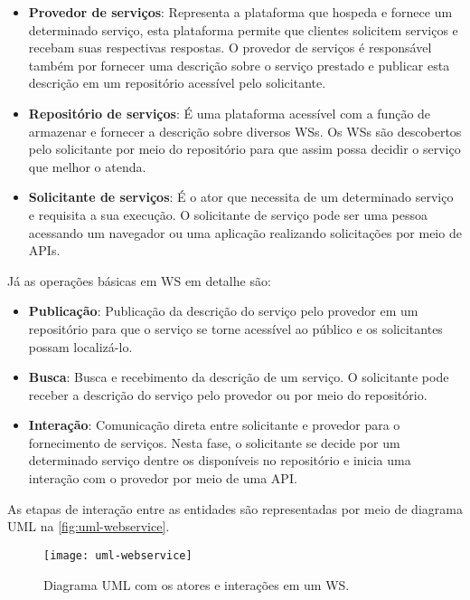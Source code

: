 	\begin{itemize}
		\item \textbf{Provedor de serviços}: Representa a plataforma que hospeda e fornece um determinado serviço, esta plataforma permite que clientes solicitem serviços e recebam suas respectivas respostas. O provedor de serviços é responsável também por fornecer uma descrição sobre o serviço prestado e publicar esta descrição em um repositório acessível pelo solicitante.
		
		\item \textbf{Repositório de serviços}: É uma plataforma acessível com a função de armazenar e fornecer a descrição sobre diversos WSs. Os WSs são descobertos pelo solicitante por meio do repositório para que assim possa decidir o serviço que melhor o atenda.
		
		\item \textbf{Solicitante de serviços}: É o ator que necessita de um determinado serviço e requisita a sua execução. O solicitante de serviço pode ser uma pessoa acessando um navegador ou uma aplicação realizando solicitações por meio de APIs.		
	\end{itemize}	
	
	Já as operações básicas em WS em detalhe são:
	
	\begin{itemize}
		\item \textbf{Publicação}: Publicação da descrição do serviço pelo provedor em um repositório para que o serviço se torne acessível ao público e os solicitantes possam localizá-lo.
		
		\item \textbf{Busca}: Busca e recebimento da descrição de um serviço. O solicitante pode receber a descrição do serviço pelo provedor ou por meio do repositório.
		
		\item \textbf{Interação}: Comunicação direta entre solicitante e provedor para o fornecimento de serviços. Nesta fase, o solicitante se decide por um determinado serviço dentre os disponíveis no repositório e inicia uma interação com o provedor por meio de uma API.
	\end{itemize}
	
	As etapas de interação entre as entidades são representadas por meio de diagrama UML na \autoref{fig:uml-webservice}. 
	
	\begin{figure}[htb]
		\centering
		\caption{Diagrama UML com os atores e interações em um WS.}
		\label{fig:uml-webservice}
		\texttt{[image: uml-webservice]}
	\end{figure}

